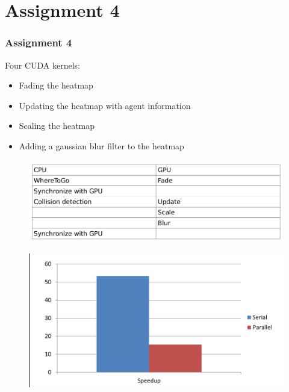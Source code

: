 \documentclass{beamer}
\begin{document}
\section{Assignment 4}
\begin{frame}
	\frametitle{Assignment 4}
	Four CUDA kernels:
	\begin{itemize}
	\item
	Fading the heatmap 
	\item
	Updating the heatmap with agent information
	\item
	Scaling the heatmap
	\item
	Adding a gaussian blur filter to the heatmap
	\end{itemize}
\end{frame}

\begin{frame}
	\begin{figure}[h!]
	\includegraphics[width=\textwidth]{lab4graph1.png}
	\end{figure}
\end{frame}

\begin{frame}
	\begin{figure}[h!]
	\includegraphics[width=\textwidth]{lab4graph2.png}
	\end{figure}
\end{frame}

\begin{frame}[plain]
	\begin{centering}
	\par
	\end{centering}
\end{frame}
\end{document}
